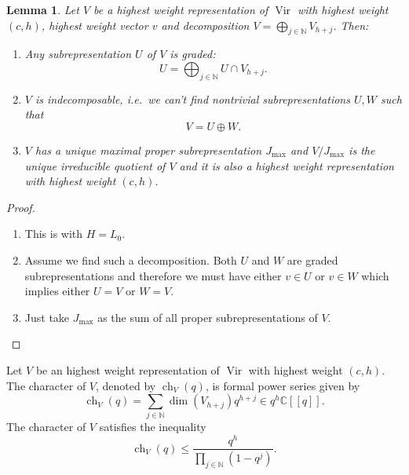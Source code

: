 \documentclass[a4paper, 12pt, reqno]{amsart}
\newtheorem{lemma}[theorem]{Lemma}
\theoremstyle{remark}
\numberwithin{equation}{subsection}
\DeclareMathOperator{\Vir}{Vir}
\DeclareMathOperator{\ch}{ch}
\begin{document}
\begin{lemma}
  \label{lmm:16}
  Let $V$ be a highest weight representation of $\Vir$ with highest weight $(c, h)$, highest weight vector $v$ and decomposition $V = \bigoplus_{j \in \mathbb{N}}V_{h + j}$.
  Then:
  \begin{enumerate}
  \item Any subrepresentation $U$ of $V$ is graded:
    \begin{equation*}
      U = \bigoplus_{j \in \mathbb{N}}U \cap V_{h + j}.
    \end{equation*}
  \item $V$ is indecomposable, i.e.\ we can't find nontrivial subrepresentations $U, W$ such that
    \begin{equation*}
      V = U \oplus W.
    \end{equation*}
  \item $V$ has a unique maximal proper subrepresentation $J_{\max}$ and $V/J_{\max}$ is the unique irreducible quotient of $V$ and it is also a highest weight representation with highest weight $(c, h)$.
  \end{enumerate}
\end{lemma}

\begin{proof}\leavevmode
  \begin{enumerate}
  \item This is  with $H = L_0$.
  \item Assume we find such a decomposition.
    Both $U$ and $W$ are graded subrepresentations and therefore we must have either $v \in U$ or $v \in W$ which implies either $U = V$ or $W = V$.
  \item Just take $J_{\max}$ as the sum of all proper subrepresentations of $V$. \qedhere
  \end{enumerate}
\end{proof}

Let $V$ be an highest weight representation of $\Vir$ with highest weight $(c, h)$.
The character of $V$, denoted by $\ch_V(q)$, is formal power series given by
\begin{equation*}
  \ch_V(q) = \sum_{j \in \mathbb{N}}\dim(V_{h + j})q^{h + j} \in q^h\mathbb{C}[[q]].
\end{equation*}
The character of $V$ satisfies the inequality
\begin{equation*}
  \ch_V(q) \le \frac{q^h}{\prod_{j \in \mathbb{N}}(1 - q^j)}.
\end{equation*}
\end{document}
